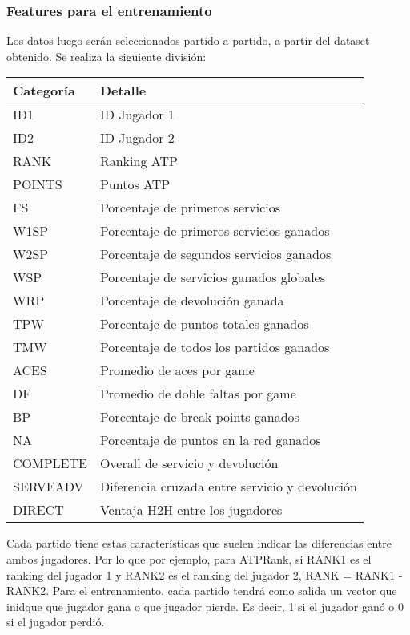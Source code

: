 \documentclass[11pt]{article}
\begin{document}
    \subsubsection{Features para el
entrenamiento}\label{features-para-el-entrenamiento}

Los datos luego serán seleccionados partido a partido, a partir del
dataset obtenido. Se realiza la siguiente división:

\begin{longtable}[]{@{}ll@{}}
\toprule
Categoría & Detalle\tabularnewline
\midrule
\endhead
ID1 & ID Jugador 1\tabularnewline
ID2 & ID Jugador 2\tabularnewline
RANK & Ranking ATP\tabularnewline
POINTS & Puntos ATP\tabularnewline
FS & Porcentaje de primeros servicios\tabularnewline
W1SP & Porcentaje de primeros servicios ganados\tabularnewline
W2SP & Porcentaje de segundos servicios ganados\tabularnewline
WSP & Porcentaje de servicios ganados globales\tabularnewline
WRP & Porcentaje de devolución ganada\tabularnewline
TPW & Porcentaje de puntos totales ganados\tabularnewline
TMW & Porcentaje de todos los partidos ganados\tabularnewline
ACES & Promedio de aces por game\tabularnewline
DF & Promedio de doble faltas por game\tabularnewline
BP & Porcentaje de break points ganados\tabularnewline
NA & Porcentaje de puntos en la red ganados\tabularnewline
COMPLETE & Overall de servicio y devolución\tabularnewline
SERVEADV & Diferencia cruzada entre servicio y devolución\tabularnewline
DIRECT & Ventaja H2H entre los jugadores\tabularnewline
\bottomrule
\end{longtable}

Cada partido tiene estas características que suelen indicar las
diferencias entre ambos jugadores. Por lo que por ejemplo, para ATPRank,
si RANK1 es el ranking del jugador 1 y RANK2 es el ranking del jugador
2, RANK = RANK1 - RANK2. Para el entrenamiento, cada partido tendrá como
salida un vector que inidque que jugador gana o que jugador pierde. Es
decir, 1 si el jugador ganó o 0 si el jugador perdió.
\end{document}

